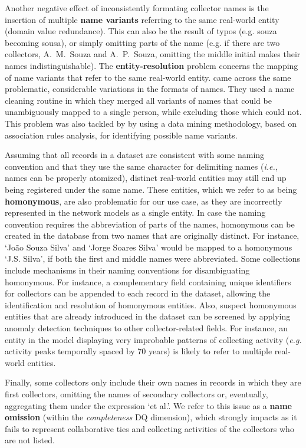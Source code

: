 Another negative effect of inconsistently formating collector names is the insertion of multiple \textbf{name variants} referring to the same real-world entity (domain value redundance).
This can also be the result of typos (e.g. souza becoming sousa), or simply omitting parts of the name (e.g. if there are two collectors, A.~M.~Souza and A.~P.~Souza, omitting the middle initial makes their names indistinguishable).
%
The \textbf{entity-resolution} problem concerns the mapping of name variants that refer to the same real-world entity.
 came across the same problematic, considerable variations in the formats of names.
They used a name cleaning routine in which they merged all variants of names that could be unambiguously mapped to a single person, while excluding those which could not.
This problem was also tackled by  by using a data mining methodology, based on association rules analysis, for identifying possible name variants.

Assuming that all records in a dataset are consistent with some naming convention and that they use the same character for delimiting names (\textit{i.e.}, names can be properly atomized), distinct real-world entities may still end up being registered under the same name.
These entities, which we refer to as being \textbf{homonymous}, are also problematic for our use case, as they are incorrectly represented in the network models as a single entity.
In case the naming convention requires the abbreviation of parts of the names, homonymous can be created in the database from two names that are originally distinct.
For instance, `João Souza Silva' and `Jorge Soares Silva' would be mapped to a homonymous `J.S. Silva', if both the first and middle names were abbreviated.
%
Some collections include mechanisms in their naming conventions for disambiguating homonymous.
For instance, a complementary field containing unique identifiers for collectors can be appended to each record in the dataset, allowing the identification and resolution of homonymous entities.
Also, suspect homonymous entities that are already introduced in the dataset can be screened by applying anomaly detection techniques to other collector-related fields.
For instance, an entity in the model displaying very improbable patterns of collecting activity (\textit{e.g.} activity peaks temporally spaced by 70 years) is likely to refer to multiple real-world entities.

Finally, some collectors only include their own names in records in which they are first collectors, omitting the names of secondary collectors or, eventually, aggregating them under the expression `et al.'.
We refer to this issue as a \textbf{name omission} (within the \textit{completeness} DQ dimension), which strongly impacts as it fails to represent collaborative ties and collecting activities of the collectors who are not listed.

